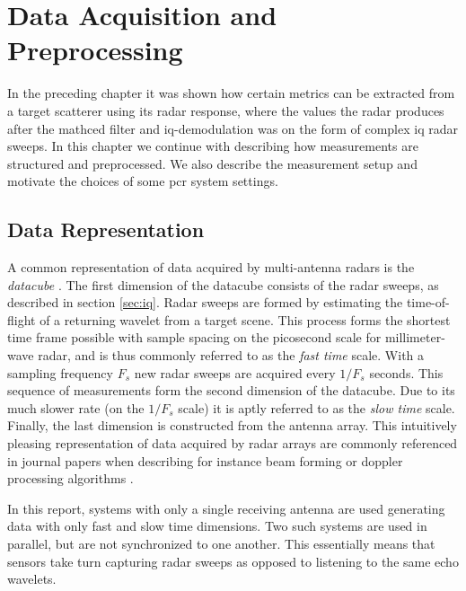\chapter{Data Acquisition and Preprocessing}\label{ch:3}

In the preceding chapter it was shown how certain metrics can be extracted from a target scatterer using its radar response, where the values the radar produces after the mathced filter and \gls{iq}-demodulation was on the form of complex \gls{iq} radar sweeps. In this chapter we continue with describing how measurements are structured and preprocessed. We also describe the measurement setup and motivate the choices of some \gls{pcr} system settings.

\section{Data Representation}

A common representation of data acquired by multi-antenna radars is the \emph{datacube} \citep{richards_2014}. The first dimension of the datacube consists of the radar sweeps, as described in section \ref{sec:iq}. Radar sweeps are formed by estimating the time-of-flight of a returning wavelet from a target scene. This process forms the shortest time frame possible with sample spacing on the picosecond scale for millimeter-wave radar, and is thus commonly referred to as the \emph{fast time} scale. With a sampling frequency $F_s$ new radar sweeps are acquired every $1/F_s$ seconds. This sequence of measurements form the second dimension of the datacube. Due to its much slower rate (on the $1/F_s$ scale) it is aptly referred to as the \emph{slow time} scale. Finally, the last dimension is constructed from the antenna array. This intuitively pleasing representation of data acquired by radar arrays are commonly referenced in journal papers when describing for instance beam forming or doppler processing algorithms \citep{gentile_donovan_2018}. 

In this report, systems with only a single receiving antenna are used generating data with only fast and slow time dimensions. Two such systems are used in parallel, but are not synchronized to one another. This essentially means that sensors take turn capturing radar sweeps as opposed to listening to the same echo wavelets. %

